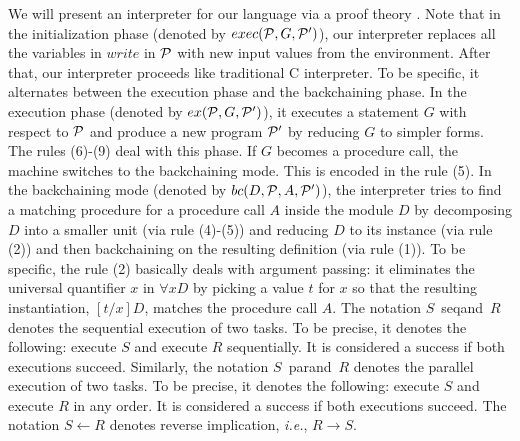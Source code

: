 \documentclass[12pt]{article}
\newcommand{\Pscr}{{\cal P}}
\newcommand{\all}{\forall}
\newcommand{\ie}{{\em i.e.}}
\begin{document}
 We will  present an interpreter for our language via a proof theory \cite{Khan87,MNPS91}.
 Note that in the initialization phase (denoted by $exec(\Pscr,G,\Pscr')$), our interpreter
 replaces all the variables in $write$ in $\Pscr$
 with new input values from the environment. 
After that, our interpreter proceeds like traditional C interpreter.
 To be specific, it alternates between 
 the  execution phase 
and the backchaining phase.  
In  the  execution phase (denoted by $ex(\Pscr,G,\Pscr')$), it  
executes a statement $G$  with respect to
 $\Pscr$ and
produce a new program $\Pscr'$
by reducing $G$ 
to simpler forms. The rules
(6)-(9) deal with this phase.
If $G$ becomes a procedure call, the machine switches to the backchaining mode. This is encoded in the rule (5). 
In the backchaining mode (denoted by $bc(D,\Pscr,A,\Pscr')$), the interpreter tries 
to find a matching procedure  for a procedure call $A$ inside the module $D$
 by decomposing $D$ into a smaller unit (via rule (4)-(5)) and
 reducing $D$ to  its instance
 (via rule (2)) and then backchaining on the resulting 
definition (via rule (1)).
 To be specific, the rule (2) basically deals with argument passing: it eliminates the universal quantifier $x$ in $\all x D$
by picking a value $t$ for
$x$ so that the resulting instantiation,  $[t/x]D$, matches the procedure call $A$.
The notation $S$\ seqand\ $R$ denotes the  sequential execution of two tasks. To be precise, it denotes
the following: execute $S$ and execute
$R$ sequentially. It is considered a success if both executions succeed.
Similarly, the notation $S$\ parand\ $R$ denotes the  parallel execution of two tasks. To be precise, it denotes
the following: execute $S$ and execute
$R$  in any order.  It is considered a success if both executions succeed.
The notation $S \leftarrow R$ denotes  reverse implication, \ie, $R \rightarrow S$.
\end{document}
